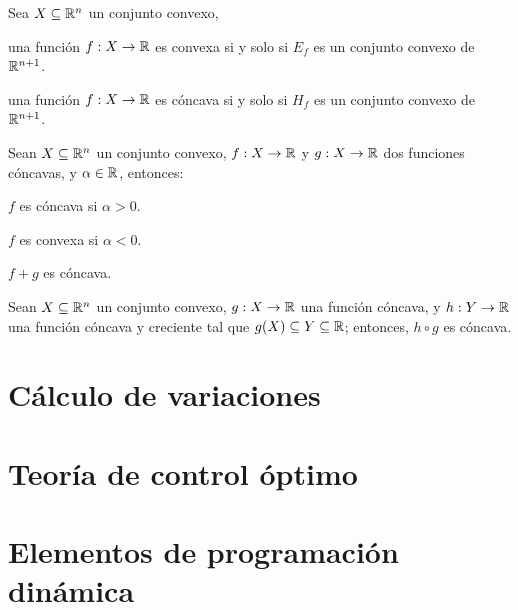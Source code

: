 \documentclass[8pt,a4paper]{extarticle}
\begin{document}
\begin{multicols}{3}
\begin{boxtheo}
	Sea $X \subseteq \mathbb{R}^n$ un conjunto convexo,
	\begin{eqlist}
	\item una función $f : X \to \mathbb{R}$ es convexa si y solo si $E_f$ es un conjunto convexo de $\mathbb{R}^{n+1}$.
	\item una función $f : X \to \mathbb{R}$ es cóncava si y solo si $H_f$ es un conjunto convexo de $\mathbb{R}^{n+1}$.
	\end{eqlist}
\end{boxtheo}

\begin{boxprop}
	Sean $X \subseteq \mathbb{R}^n$ un conjunto convexo, $f : X \to \mathbb{R}$ y $g : X \to \mathbb{R}$ dos funciones cóncavas, y $\alpha \in \mathbb{R}$, entonces:
	\begin{eqlist}
	\item $f$ es cóncava si $\alpha > 0$.
	\item $f$ es convexa si $\alpha < 0$.
	\item $f+g$ es cóncava.
	\end{eqlist}
\end{boxprop}

\begin{boxprop}
	Sean $X \subseteq \mathbb{R}^n$ un conjunto convexo, $g : X \to \mathbb{R}$ una función cóncava, y $h : Y \to \mathbb{R}$ una función cóncava y creciente tal que $g(X) \subseteq Y \subseteq \mathbb{R}$; entonces, $h \circ g$ es cóncava.
\end{boxprop}

\newpage

\section{Cálculo de variaciones}

\newpage

\section{Teoría de control óptimo}

\newpage

\section{Elementos de programación dinámica}

\vfill\eject
\columnbreak
\end{multicols}
\end{document}
